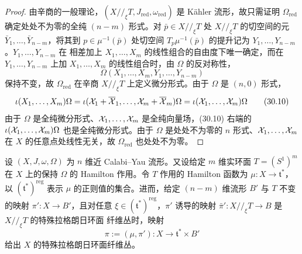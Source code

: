 \begin{proof}
由辛商的一般理论，$(X/\!/_{\xi}T, J_{\mathrm{red}}, \omega_{\mathrm{red}})$ 是
Kähler 流形，故只需证明 $\Omega_{\mathrm{red}}$ 确定处处不为零的全纯
$(n-m)$ 形式。对 $\bar p \in X/\!/_{\xi}T$ 处 $X/\!/_{\xi}T$ 的切空间的元
$\bar Y_1,\dots,\bar Y_{n-m}$，将其到 $p \in \mu^{-1}(\bar p)$ 处切空间
$T_p\mu^{-1}(\bar p)$ 的提升记为 $Y_1,\dots,Y_{n-m}$。$Y_1,\dots,Y_{n-m}$ 在
相差加上 $X_1,\dots,X_m$ 的线性组合的自由度下唯一确定，而在
$Y_1,\dots,Y_{n-m}$ 上加 $X_1,\dots,X_m$ 的线性组合时，由 $\Omega$ 的反对称性，
\begin{equation}
  \Omega(X_1,\dots,X_m,Y_1,\dots,Y_{n-m}) \tag{30.9}
\end{equation}
保持不变，故 $\Omega_{\mathrm{red}}$ 在辛商 $X/\!/_{\xi}T$ 上定义微分形式。由于
$\Omega$ 是 $(n,0)$ 形式，
\begin{equation}
  \iota(X_1,\dots,X_m)\Omega
  = \iota(\mathcal{X}_1+\overline{\mathcal{X}}_1,\dots,\mathcal{X}_m+\overline{\mathcal{X}}_m)\Omega
  = \iota(\mathcal{X}_1,\dots,\mathcal{X}_m)\Omega \tag{30.10}
\end{equation}
由于 $\Omega$ 是全纯微分形式、$\mathcal{X}_1,\dots,\mathcal{X}_m$ 是全纯向量场，(30.10) 右端的
$\iota(\mathcal{X}_1,\dots,\mathcal{X}_m)\Omega$ 也是全纯微分形式。由于 $\Omega$ 是处处不为零的
$n$ 形式、$\mathcal{X}_1,\dots,\mathcal{X}_m$ 在 $X$ 的任意点处线性无关，故
$\Omega_{\mathrm{red}}$ 也处处不为零。
\end{proof}

\begin{theorem}
设 $(X,J,\omega,\Omega)$ 为 $n$ 维近 Calabi–Yau 流形。又设给定 $m$ 维实环面
$T = (S^1)^m$ 在 $X$ 上的保持 $\Omega$ 的 Hamilton 作用。令 $T$ 作用的
Hamilton 函数为 $\mu: X \to \mathfrak{t}^*$，以 $(\mathfrak{t}^*)^{\mathrm{reg}}$
表示 $\mu$ 的正则值的集合。进而，给定 $(n-m)$ 维流形 $B'$ 与 $T$ 不变的映射
$\pi': X \to B'$，且对任意 $\xi \in (\mathfrak{t}^*)^{\mathrm{reg}}$，$\pi'$
诱导的映射 $\bar\pi': X/\!/_{\xi}T \to B$ 是 $X/\!/_{\xi}T$ 的特殊拉格朗日环面
纤维丛时，映射
\begin{equation}
  \pi := (\mu,\pi'): X \to \mathfrak{t}^*\times B' \tag{30.11}
\end{equation}
给出 $X$ 的特殊拉格朗日环面纤维丛。
\end{theorem}


